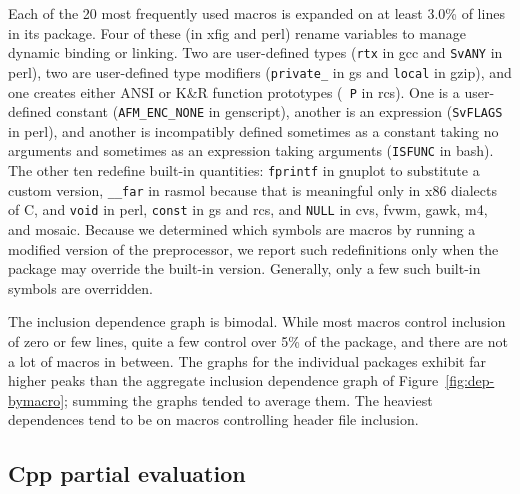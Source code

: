 \documentclass[10pt]{article}
\newcommand{\comment}[1]{\textbf{[[#1]]}}
\newcommand{\pkg}[1]{\textsf{#1}}
\begin{document}
Each of the 20 most frequently used macros is expanded on at least 3.0\% of
lines in its package.  Four of these (in \pkg{xfig} and \pkg{perl}) rename
variables to manage dynamic binding or linking.  Two are user-defined types
({\tt rtx} in \pkg{gcc} and {\tt SvANY} in \pkg{perl}), two are user-defined
type modifiers (\verb|private_| in \pkg{gs} and \verb|local| in
\pkg{gzip}), and one creates either ANSI or K\&R function prototypes ({\tt
P} in \pkg{rcs}).  One is a user-defined constant (\verb|AFM_ENC_NONE| in
\pkg{genscript}), another is an expression ({\tt SvFLAGS} in \pkg{perl}),
and another is incompatibly defined sometimes as a constant taking no
arguments and sometimes as an expression taking arguments ({\tt ISFUNC} in
\pkg{bash}).  The other ten redefine built-in quantities:  {\tt fprintf} in
\pkg{gnuplot} to substitute a custom version, \verb|__far| in \pkg{rasmol}
because that is meaningful only in x86 dialects of C, and {\tt void} in
\pkg{perl}, {\tt const} in \pkg{gs} and \pkg{rcs}, and {\tt NULL} in
\pkg{cvs}, \pkg{fvwm}, \pkg{gawk}, \pkg{m4}, and \pkg{mosaic}.  
Because we determined which symbols are macros by running a modified
version of the preprocessor, we report such redefinitions only when the
package may override the built-in version.  Generally, only a few such
built-in symbols are overridden.


The inclusion dependence graph is bimodal.  While most macros control
inclusion of zero or few lines, quite a few control over 5\% of the
package, and there are not a lot of macros in between.  The graphs for the
individual packages exhibit far higher peaks than the aggregate inclusion
dependence graph of Figure~\ref{fig:dep-bymacro}; summing the graphs tended
to average them.  The heaviest dependences tend to be on macros controlling
header file inclusion.




\subsection{Cpp partial evaluation}

\end{document}
